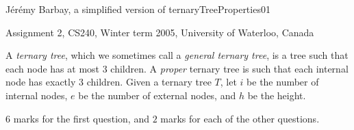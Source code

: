 \begin{authorship}J{\'e}r{\'e}my Barbay, a simplified version of ternaryTreeProperties01\end{authorship}
\begin{usage}Assignment 2, CS240, Winter term 2005, University of Waterloo, Canada\end{usage}

A {\em ternary tree}, which we sometimes call a {\em general ternary tree},
is a tree such that each node has at most $3$ children.
A {\em proper} ternary tree is such that each internal node has exactly $3$ children.
%
Given a ternary tree $T$, let
  $i$ be the number of internal nodes,
  $e$ be the number of external nodes, and
  $h$ be the height.


\begin{markingScheme}
$6$ marks for the first question,
and $2$ marks for each of the other questions.
\end{markingScheme}


